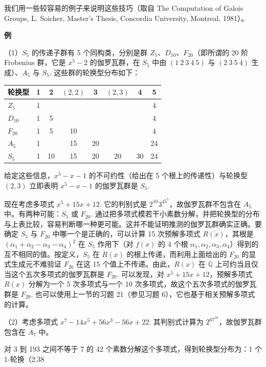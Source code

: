 我们用一些较容易的例子来说明这些技巧（取自 The Computation of Galois Groups, L. Soicher, Master's Thesis, Concordia University, Montreal, 1981）。

\noindent\textbf{例}

（1）\(S_5\) 的传递子群有 5 个同构类，分别是群 \(Z_5\)、\(D_{10}\)、\(F_{20}\)（即所谓的 20 阶 Frobenius 群，它是 \(x^5-2\) 的伽罗瓦群，在 \(S_5\) 中由 \((1\ 2\ 3\ 4\ 5)\) 与 \((2\ 3\ 5\ 4)\) 生成）、\(A_5\) 与 \(S_5\). 这些群的轮换型分布如下：

\begin{center}
\begin{tabular}{lccccccc}
\hline
轮换型 & 1 & 2 & \((2,2)\) & 3 & \((2,3)\) & 4 & 5\\
\hline
\(Z_5\) & 1 & & & & & & 4\\
\(D_{10}\) & 1 & 5 & & & & & 4\\
\(F_{20}\) & 1 & 5 & 10 & & & & 4\\
\(A_5\) & 1 & & 15 & 20 & & & 24\\
\(S_5\) & 1 & 10 & 15 & 20 & 20 & 30 & 24\\
\hline
\end{tabular}
\end{center}

给定这些信息，\(x^5-x-1\) 的不可约性（给出在 5 个根上的传递性）与轮换型 \((2,3)\) 立即表明 \(x^5-x-1\) 的伽罗瓦群是 \(S_5\).

现在考虑多项式 \(x^5+15x+12\). 它的判别式是 \(2^{10}3^45^5\)，故伽罗瓦群不包含在 \(A_5\) 中。有两种可能：\(S_5\) 或 \(F_{20}\). 通过把多项式模若干小素数分解，并把轮换型的分布与上表比较，容易判断哪一种更可能。这并不能证明推测的伽罗瓦群确实正确。要确定 \(S_5\) 与 \(F_{20}\) 中哪一个是正确的，可以计算 15 次预解多项式 \(R(x)\)，其根是 \((\alpha_1+\alpha_2-\alpha_3-\alpha_4)^2\) 在 \(S_5\) 作用下（对 \(f(x)\) 的 4 个根 \(\alpha_1, \alpha_2, \alpha_3, \alpha_4\)）得到的互不相同的值。按定义，\(S_5\) 在 \(R(x)\) 的根上传递，而利用上面给出的 \(F_{20}\) 的显式生成元不难验证 \(F_{20}\) 在这 15 个值上不传递。由此，\(R(x)\) 在 \(\mathbb{Q}\) 上可约当且仅当这个五次多项式的伽罗瓦群是 \(F_{20}\). 可以发现，对 \(x^5+15x+12\)，预解多项式 \(R(x)\) 分解为一个 5 次多项式与一个 10 次多项式，故这个五次多项式的伽罗瓦群是 \(F_{20}\). 也可以使用上一节的习题 21（参见习题 6），它也基于相关预解多项式的计算。

（2）考虑多项式 \(x^7-14x^5+56x^3-56x+22\). 其判别式计算为 \(2^67^{10}\)，故伽罗瓦群包含在 \(A_7\) 中。

对 3 到 193 之间不等于 7 的 42 个素数分解这个多项式，得到轮换型分布为：1 个 1-轮换（2.38%

